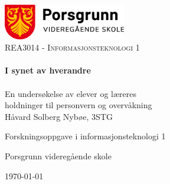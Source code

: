 \begin{titlepage}
    \vbox{ }

    \vbox{ }

    \begin{center}
        \includegraphics[width=0.40\textwidth]{img/porsgrunn-vgs.png}\\[1cm]
        \textsc{\Large REA3014 - Informasjonsteknologi 1}\\[0.6cm]

        \vbox{ }
        \noindent\makebox[\linewidth]{\rule{.7\paperwidth}{.6pt}}\\[0.7cm]
        { \huge \bfseries I synet av hverandre}\\[0.25cm]
        \noindent\makebox[\linewidth]{\rule{.7\paperwidth}{.6pt}}\\[0.2cm]
        \large{En undersøkelse av elever og læreres\\ holdninger til personvern og overvåkning}\\[1.2cm]
        \vfill
        \large
        Håvard Solberg Nybøe, 3STG

        Forskningsoppgave i informasjonsteknologi 1

        Porsgrunn videregående skole

        {\large \today}
    \end{center}
\end{titlepage}